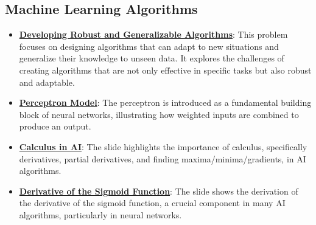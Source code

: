 \documentclass{article}%
\begin{document}
\subsection{Machine Learning Algorithms}%
\label{subsec:MachineLearningAlgorithms}%
\begin{itemize}[leftmargin=*]%
\item \href{https://purdue.brightspace.com/d2l/common/assets/pdfjs-d2l-dist/1.0.14-legacy/web/viewer.html?file=\%2Fcontent\%2Fenforced\%2F1095467-wl.202510.CS.24300.001\%2F02L2-Intro.pdf\%3Fou\%3D1095467\&lang=en-us\&container=d2l-fileviewer-rendered-pdf\&fullscreen=d2l-fileviewer-rendered-pdf-dialog\&height=667#page=36}{\textbf{Developing Robust and Generalizable Algorithms}}: This problem focuses on designing algorithms that can adapt to new situations and generalize their knowledge to unseen data. It explores the challenges of creating algorithms that are not only effective in specific tasks but also robust and adaptable.%
\item \href{https://purdue.brightspace.com/d2l/common/assets/pdfjs-d2l-dist/1.0.14-legacy/web/viewer.html?file=\%2Fcontent\%2Fenforced\%2F1095467-wl.202510.CS.24300.001\%2F04L1-Linear Algebra Primer.pdf\%3Fou\%3D1095467\&lang=en-us\&container=d2l-fileviewer-rendered-pdf\&fullscreen=d2l-fileviewer-rendered-pdf-dialog\&height=667#page=17}{\textbf{Perceptron Model}}: The perceptron is introduced as a fundamental building block of neural networks, illustrating how weighted inputs are combined to produce an output.%
\item \href{https://purdue.brightspace.com/d2l/common/assets/pdfjs-d2l-dist/1.0.14-legacy/web/viewer.html?file=\%2Fcontent\%2Fenforced\%2F1095467-wl.202510.CS.24300.001\%2F04L1-Linear Algebra Primer.pdf\%3Fou\%3D1095467\&lang=en-us\&container=d2l-fileviewer-rendered-pdf\&fullscreen=d2l-fileviewer-rendered-pdf-dialog\&height=667#page=19}{\textbf{Calculus in AI}}: The slide highlights the importance of calculus, specifically derivatives, partial derivatives, and finding maxima/minima/gradients, in AI algorithms.%
\item \href{https://purdue.brightspace.com/d2l/common/assets/pdfjs-d2l-dist/1.0.14-legacy/web/viewer.html?file=\%2Fcontent\%2Fenforced\%2F1095467-wl.202510.CS.24300.001\%2F04L1-Linear Algebra Primer.pdf\%3Fou\%3D1095467\&lang=en-us\&container=d2l-fileviewer-rendered-pdf\&fullscreen=d2l-fileviewer-rendered-pdf-dialog\&height=667#page=21}{\textbf{Derivative of the Sigmoid Function}}: The slide shows the derivation of the derivative of the sigmoid function, a crucial component in many AI algorithms, particularly in neural networks.%

\end{itemize}
\end{document}
